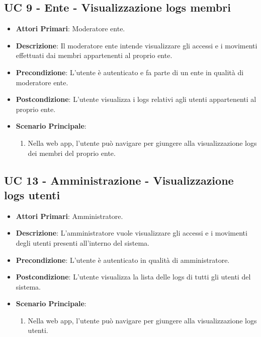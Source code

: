 		\subsection{UC 9 - Ente - Visualizzazione logs membri}
		\begin{itemize}
			\item \textbf{Attori Primari}: Moderatore ente.
			\item \textbf{Descrizione}: Il moderatore ente intende visualizzare gli accessi e i movimenti effettuati dai membri appartenenti al proprio ente.
			\item \textbf{Precondizione}: L'utente è autenticato e fa parte di un ente in qualità di moderatore ente.
			\item \textbf{Postcondizione}: L'utente visualizza i logs relativi agli utenti appartenenti al proprio ente.
			\item \textbf{Scenario Principale}:
			\begin{enumerate}
				\item Nella web app, l'utente può navigare per giungere alla visualizzazione logs dei membri del proprio ente.
			\end{enumerate}	
		\end{itemize}


		



		



		


		\subsection{UC 13 - Amministrazione - Visualizzazione logs utenti}
		\begin{itemize}
			\item \textbf{Attori Primari}: Amministratore.
			\item \textbf{Descrizione}: L'amministratore vuole visualizzare gli accessi e i movimenti degli utenti presenti all'interno del sistema.
			\item \textbf{Precondizione}: L'utente è autenticato in qualità di amministratore.
			\item \textbf{Postcondizione}: L'utente visualizza la lista delle logs di tutti gli utenti del sistema.
			\item \textbf{Scenario Principale}:
			\begin{enumerate}
				\item Nella web app, l'utente può navigare per giungere alla visualizzazione logs utenti.
			\end{enumerate}	
		\end{itemize}
		

